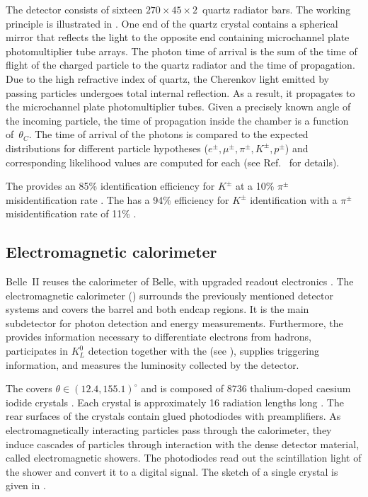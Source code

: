 The \TOP detector \cite{Fast:2017pff} consists of sixteen $270 \times 45 \times 2$~\cm quartz radiator bars.
The working principle is illustrated in .
One end of the quartz crystal contains a spherical mirror that reflects the light to the opposite end containing microchannel plate photomultiplier tube arrays.
The photon time of arrival is the sum of the time of flight of
the charged particle to the quartz radiator and the time of propagation.
Due to the high refractive index of quartz, the Cherenkov light emitted by passing particles undergoes total internal reflection.
As a result, it propagates to the microchannel plate photomultiplier tubes. 
Given a precisely known angle of the incoming particle, the time of propagation inside the chamber is a function of~$\theta_C$.
The time of arrival of the photons is compared to the expected distributions for different particle hypotheses ($e^{\pm},\mu^{\pm},\pi^{\pm},K^{\pm},p^{\pm}$) and corresponding likelihood values are computed for each (see Ref.~\cite{Yonenaga:2020eby} for details).

The \TOP provides an 85\% identification efficiency for $K^{\pm}$ at a 10\% $\pi^{\pm}$ misidentification rate \cite{Kojima:2022qcl}.
The \ARICH has a 94\% efficiency for $K^{\pm}$ identification with a $\pi^{\pm}$ misidentification rate of 11\% \cite{Yonenaga:2020eby}.

\subsection{Electromagnetic calorimeter}\label{sec:ecl}

Belle~II reuses the calorimeter of Belle, with upgraded readout electronics \cite{Belle-II:2010dht}.
The electromagnetic calorimeter (\ECL) surrounds the previously mentioned detector systems and covers the barrel and both endcap regions.
It is the main subdetector for photon detection and energy measurements.
Furthermore, the \ECL provides information necessary to differentiate electrons from hadrons, participates in $K_L^0$ detection together with the \KLM (see ),
supplies triggering information, and measures the luminosity collected by the detector.

The \ECL covers $\theta\in(12.4,155.1)^{\circ}$ and is composed of 8736 thalium-doped caesium iodide crystals \cite{Miyabayashi:2020xzp}.
Each crystal is approximately 16 radiation lengths long \cite{Aulchenko:2015nvy}.
The rear surfaces of the crystals contain glued photodiodes with preamplifiers.
As electromagnetically interacting particles pass through the calorimeter, they induce cascades of particles through interaction with the dense detector material, called electromagnetic showers.
The photodiodes read out the scintillation light of the shower and convert it to a digital signal.
The sketch of a single \ECL crystal is given in .

